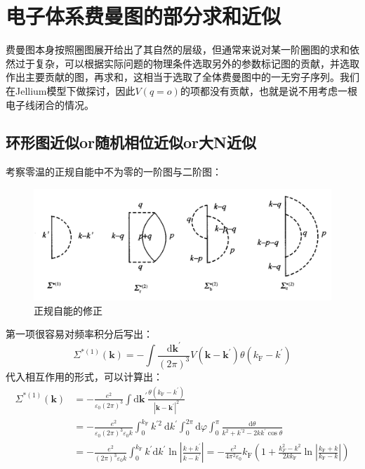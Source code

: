 \documentclass[10pt,openany]{book}
\theoremstyle{thmstyle} %
\theoremstyle{defstyle} %
\theoremstyle{prostyle} %
\begin{document}
\section{电子体系费曼图的部分求和近似}
费曼图本身按照圈图展开给出了其自然的层级，但通常来说对某一阶圈图的求和依然过于复杂，可以根据实际问题的物理条件选取另外的参数标记图的贡献，并选取作出主要贡献的图，再求和，这相当于选取了全体费曼图中的一无穷子序列。我们在Jellium模型下做探讨，因此$ V(q=o) $的项都没有贡献，也就是说不用考虑一根电子线闭合的情况。 
\subsection{环形图近似or随机相位近似or大N近似}
考察零温的正规自能中不为零的一阶图与二阶图：
\begin{figure}[htbp]
  \centering
  \includegraphics*[scale=0.7]{Figures/正规自能的修正.png}
  \caption{正规自能的修正}
\end{figure}
第一项很容易对频率积分后写出：
\begin{equation}
  \Sigma^{*(1)}(\boldsymbol{k})=-\int \frac{\mathrm{d} \boldsymbol{k}^{\prime}}{(2 \pi)^3} V\left(\boldsymbol{k}-\boldsymbol{k}^{\prime}\right) \theta\left(k_{\mathrm{F}}-k^{\prime}\right)
\end{equation}
代入相互作用的形式，可以计算出：
\begin{equation}
  \begin{aligned}
    \Sigma^{*(1)}(\boldsymbol{k}) & =-\frac{e^2}{\varepsilon_0(2 \pi)^3} \int \mathrm{d} \boldsymbol{k}^{\prime} \frac{\theta\left(k_{\mathrm{F}}-k^{\prime}\right)}{\left|\boldsymbol{k}-\boldsymbol{k}^{\prime}\right|^2} \\
    & =-\frac{e^2}{\varepsilon_0(2 \pi)^3 \varepsilon_0 k} \int_0^{k_{\mathrm{F}}} k^{\prime 2} \mathrm{~d} k^{\prime} \int_0^{2 \pi} \mathrm{d} \varphi \int_0^\pi \frac{\mathrm{d} \theta}{k^2+k^{\prime 2}-2 k k^{\prime} \cos \theta} \\
    & =-\frac{e^2}{(2 \pi)^3 \varepsilon_0 k} \int_0^{k_{\mathrm{F}}} k^{\prime} \mathrm{d} k^{\prime} \ln \left|\frac{k+k^{\prime}}{k-k^{\prime}}\right|=-\frac{e^2}{4 \pi^2 \varepsilon_0} k_{\mathrm{F}}\left(1+\frac{k_F^2-k^2}{2 k k_{\mathrm{F}}} \ln \left|\frac{k_{\mathrm{F}}+k}{k_{\mathrm{F}}-k}\right|\right)
    \end{aligned}
\end{equation}
\end{document}
